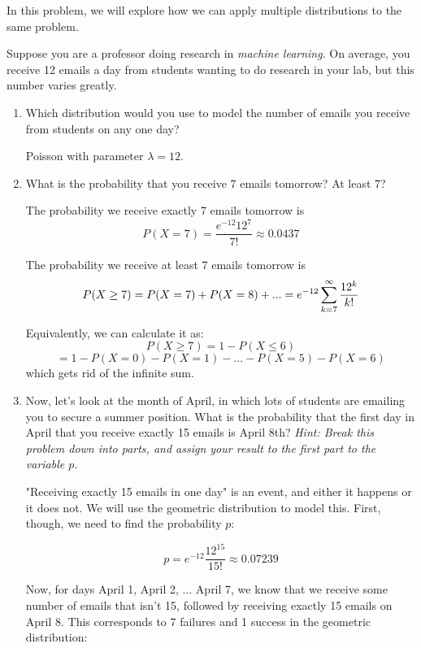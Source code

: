 \question In this problem, we will explore how we can apply multiple distributions to the same problem.

Suppose you are a professor doing research in \textit{machine learning}. On average, you receive 12 emails a day from students wanting to do research in your lab, but this number varies greatly.

\begin{enumerate}[label=(\alph*)]
\item Which distribution would you use to model the number of emails you receive from students on any one day?
\begin{solution}[2cm]
Poisson with parameter $\lambda = 12$. 
\end{solution}

\item What is the probability that you receive 7 emails tomorrow? At least 7?
\begin{solution}[2cm]
The probability we receive exactly 7 emails tomorrow is
$$P(X = 7) = \frac{e^{-12}12^7}{7!} \approx 0.0437$$

The probability we receive at least 7 emails tomorrow is
$$P(X \geq 7) = P(X = 7) + P(X = 8) + ...
\\ = e^{-12} \sum_{k = 7}^\infty \frac{12^k}{k!}$$

Equivalently, we can calculate it as:
$$P(X \geq 7) = 1 - P(X \leq 6)$$
$$= 1 - P(X = 0) - P(X = 1) - ... - P(X = 5) - P(X = 6)$$
which gets rid of the infinite sum.
\end{solution}

\item Now, let's look at the month of April, in which lots of students are emailing you to secure a summer position. What is the probability that the first day in April that you receive exactly 15 emails is April 8th? \textit{Hint: Break this problem down into parts, and assign your result to the first part to the variable $p$.}
\begin{solution}[2cm]
"Receiving exactly 15 emails in one day" is an event, and either it happens or it does not. We will use the geometric distribution to model this. First, though, we need to find the probability $p$:

$$p = e^{-12} \frac{12^{15}}{15!} \approx 0.07239$$

Now, for days April 1, April 2, ... April 7, we know that we receive some number of emails that isn't 15, followed by receiving exactly 15 emails on April 8. This corresponds to 7 failures and 1 success in the geometric distribution:


\end{solution}
\end{enumerate}
